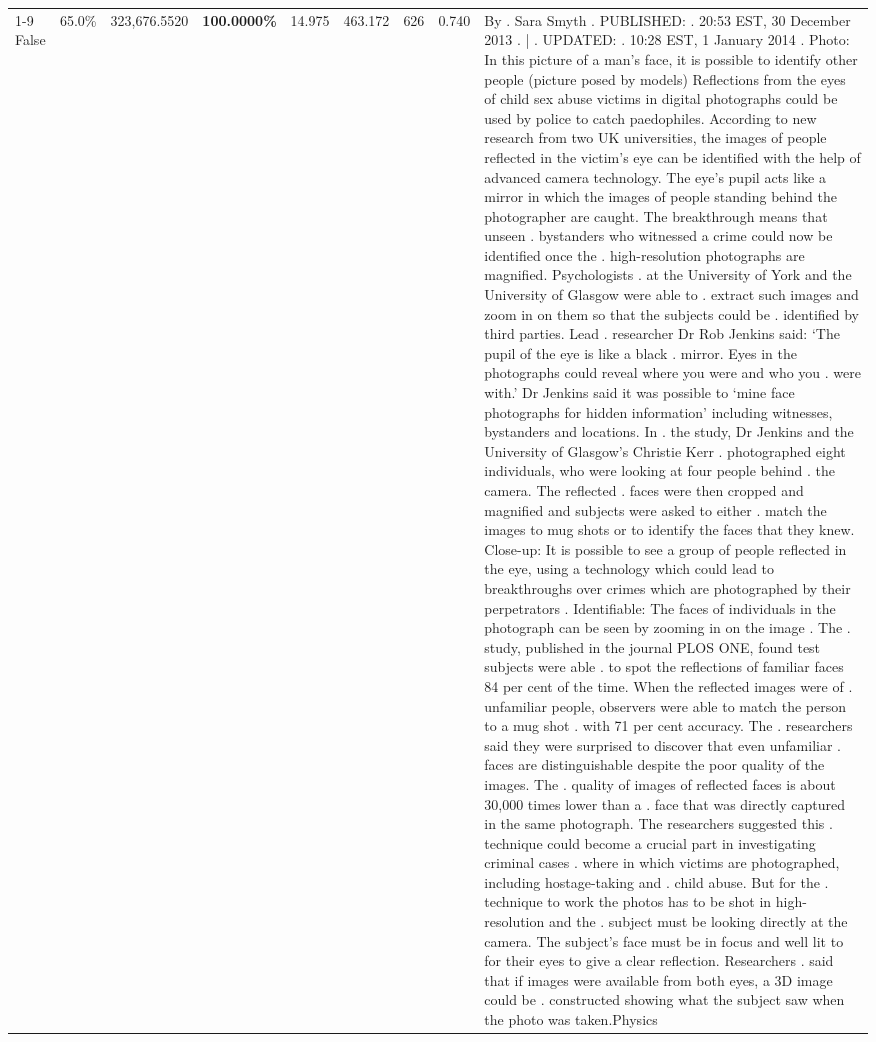 \begin{table}[H]
\begin{tabular}{lllrlllll}
\cline{1-9}
False & 65.0\% & 323,676.5520 & \bfseries \color{red} 100.0000\% & 14.975 & 463.172 & 626 & 0.740 & By . Sara Smyth . PUBLISHED: . 20:53 EST, 30 December 2013 . | . UPDATED: . 10:28 EST, 1 January 2014 . Photo: In this picture of a man's face, it is possible to identify other people (picture posed by models) Reflections from the eyes of child sex abuse victims in digital photographs could be used by police to catch paedophiles. According to new research from two UK universities, the images of people reflected in the victim's eye can be identified with the help of advanced camera technology. The eye's pupil acts like a mirror in which the images of people standing behind the photographer are caught. The breakthrough means that unseen . bystanders who witnessed a crime could now be identified once the . high-resolution photographs are magnified. Psychologists . at the University of York and the University of Glasgow were able to . extract such images and zoom in on them so that the subjects could be . identified by third parties. Lead . researcher Dr Rob Jenkins said: ‘The pupil of the eye is like a black . mirror. Eyes in the photographs could reveal where you were and who you . were with.' Dr Jenkins said it was possible to ‘mine face photographs for hidden information' including witnesses, bystanders and locations. In . the study, Dr Jenkins and the University of Glasgow's Christie Kerr . photographed eight individuals, who were looking at four people behind . the camera. The reflected . faces were then cropped and magnified and subjects were asked to either . match the images to mug shots or to identify the faces that they knew. Close-up: It is possible to see a group of people reflected in the eye, using a technology which could lead to breakthroughs over crimes which are photographed by their perpetrators . Identifiable: The faces of individuals in the photograph can be seen by zooming in on the image . The . study, published in the journal PLOS ONE, found test subjects were able . to spot the reflections of familiar faces 84 per cent of the time. When the reflected images were of . unfamiliar people, observers were able to match the person to a mug shot . with 71 per cent accuracy. The . researchers said they were surprised to discover that even unfamiliar . faces are distinguishable despite the poor quality of the images. The . quality of images of reflected faces is about 30,000 times lower than a . face that was directly captured in the same photograph. The researchers suggested this . technique could become a crucial part in investigating criminal cases . where in which victims are photographed, including hostage-taking and . child abuse. But for the . technique to work the photos has to be shot in high-resolution and the . subject must be looking directly at the camera. The subject's face must be in focus and well lit to for their eyes to give a clear reflection. Researchers . said that if images were available from both eyes, a 3D image could be . constructed showing what the subject saw when the photo was taken.Physics \\

\end{tabular}
\end{table}
